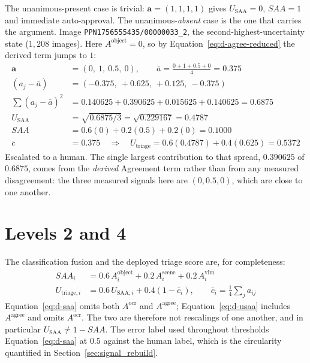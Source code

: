 \documentclass[12pt,a4paper]{report}
\begin{document}
The unanimous-present case is trivial: $\mathbf{a}=(1,1,1,1)$ gives $U_{\text{SAA}}=0$, $SAA=1$ and immediate auto-approval. The unanimous-\emph{absent} case is the one that carries the argument. Image \texttt{PPN1756555435/00000033\_2}, the second-highest-uncertainty state ($1{,}208$ images). Here $A^{\text{object}}=0$, so by Equation~\ref{eq:d-agree-reduced} the derived term jumps to $1$:
\begin{align*}
\mathbf{a} &= (0,\ 1,\ 0.5,\ 0), \qquad \bar{a} = \tfrac{0+1+0.5+0}{4} = 0.375\\
(a_j - \bar a) &= (-0.375,\ +0.625,\ +0.125,\ -0.375)\\
\textstyle\sum (a_j-\bar a)^2 &= 0.140625 + 0.390625 + 0.015625 + 0.140625 = 0.6875\\
U_{\text{SAA}} &= \sqrt{0.6875/3} = \sqrt{0.229167} = \mathbf{0.4787}\\
SAA &= 0.6(0) + 0.2(0.5) + 0.2(0) = \mathbf{0.1000}\\
\bar{c} &= 0.375 \quad\Rightarrow\quad U_{\text{triage}} = 0.6(0.4787) + 0.4(0.625) = \mathbf{0.5372}
\end{align*}
Escalated to a human. The single largest contribution to that spread, $0.390625$ of $0.6875$, comes from the \emph{derived} Agreement term rather than from any measured disagreement: the three measured signals here are $(0, 0.5, 0)$, which are close to one another.

\section{Levels 2 and 4}

The classification fusion and the deployed triage score are, for completeness:
\begin{align}
SAA_i &= 0.6\,A_i^{\text{object}} + 0.2\,A_i^{\text{scene}} + 0.2\,A_i^{\text{vlm}} \label{eq:d-saa}\\
U_{\text{triage},i} &= 0.6\,U_{\text{SAA},i} + 0.4\left(1 - \bar{c}_i\right), \qquad \bar{c}_i = \tfrac14\textstyle\sum_j a_{ij} \label{eq:d-triage}
\end{align}
Equation~\ref{eq:d-saa} omits both $A^{\text{ocr}}$ and $A^{\text{agree}}$; Equation~\ref{eq:d-usaa} includes $A^{\text{agree}}$ and omits $A^{\text{ocr}}$. The two are therefore not rescalings of one another, and in particular $U_{\text{SAA}} \neq 1 - SAA$. The error label used throughout thresholds Equation~\ref{eq:d-saa} at $0.5$ against the human label, which is the circularity quantified in Section~\ref{sec:signal_rebuild}.



\end{document}
